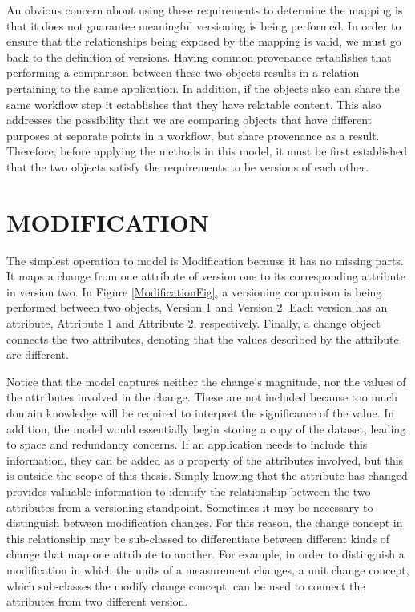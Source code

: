 An obvious concern about using these requirements to determine the mapping is that it does not guarantee meaningful versioning is being performed.
In order to ensure that the relationships being exposed by the mapping is valid, we must go back to the definition of versions.
Having common provenance establishes that performing a comparison between these two objects results in a relation pertaining to the same application.
In addition, if the objects also can share the same workflow step it establishes that they have relatable content.
This also addresses the possibility that we are comparing objects that have different purposes at separate points in a workflow, but share provenance as a result.
Therefore, before applying the methods in this model, it must be first established that the two objects satisfy the requirements to be versions of each other.

\section{MODIFICATION}

The simplest operation to model is Modification because it has no missing parts.
It maps a change from one attribute of version one to its corresponding attribute in version two.
In Figure \ref{ModificationFig}, a versioning comparison is being performed between two objects, Version 1 and Version 2.
Each version has an attribute, Attribute 1 and Attribute 2, respectively.
Finally, a change object connects the two attributes, denoting that the values described by the attribute are different.

Notice that the model captures neither the change's magnitude, nor the values of the attributes involved in the change.
These are not included because too much domain knowledge will be required to interpret the significance of the value.
In addition, the model would essentially begin storing a copy of the dataset, leading to space and redundancy concerns.
If an application needs to include this information, they can be added as a property of the attributes involved, but this is outside the scope of this thesis.
Simply knowing that the attribute has changed provides valuable information to identify the relationship between the two attributes from a versioning standpoint.
Sometimes it may be necessary to distinguish between modification changes.
For this reason, the change concept in this relationship may be sub-classed to differentiate between different kinds of change that map one attribute to another.
For example, in order to distinguish a modification in which the units of a measurement changes, a unit change concept, which sub-classes the modify change concept, can be used to connect the attributes from two different version.

